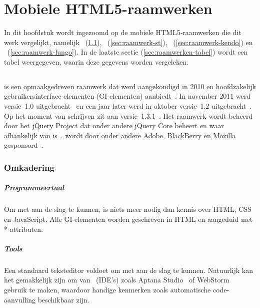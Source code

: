 \chapter{Mobiele HTML5-raamwerken}
\label{chap:raamwerken}


In dit hoofdstuk wordt ingezoomd op de mobiele HTML5-raamwerken die dit werk vergelijkt, namelijk \jqm{}~(\ref{sec:raamwerk-jqm}), \st{}~(\ref{sec:raamwerk-st}), \kendo{}~(\ref{sec:raamwerk-kendo}) en \lungo{}~(\ref{sec:raamwerk-lungo}).
In de laatste sectie (\ref{sec:raamwerken-tabel}) wordt een tabel weergegeven, waarin deze gegevens worden vergeleken.

\section{\jqm}
\label{sec:raamwerk-jqm}
\jqm{} is een opmaakgedreven raamwerk dat werd aangekondigd in 2010 en hoofdzakelijk gebruikersinterface-elementen (GI-elementen) aanbiedt~\cite{Resig2010}.
In november 2011 werd versie~1.0 uitgebracht~\cite{Parker2011} en een jaar later werd in oktober versie~1.2 uitgebracht~\cite{Parker2012}. 
Op het moment van schrijven zit \jqm{} aan versie~1.3.1~\cite{Parker2013b}. 
Het raamwerk wordt beheerd door het jQuery Project dat onder andere jQuery Core beheert en waar \jqm{} afhankelijk van is~\cite{JQuery2012}. 
\jqm{} wordt door onder andere Adobe, BlackBerry en Mozilla gesponsord~\cite{JQuery2012a}.

\subsection{Omkadering}
\paragraph{Programmeertaal}
Om met \jqm{} aan de slag te kunnen, is niets meer nodig dan kennis over HTML, CSS en JavaScript. 
Alle GI-elementen worden geschreven in HTML en aangeduid met * attributen.

\paragraph{Tools}
Een standaard teksteditor voldoet om met \jqm{} aan de slag te kunnen. 
Natuurlijk kan het gemakkelijk zijn om van ~(IDE's) zoals Aptana Studio~\cite{Aptana2012} of WebStorm~\cite{JetBrains2012} gebruik te maken, waardoor handige kenmerken zoals automatische code-aanvulling beschikbaar zijn.

